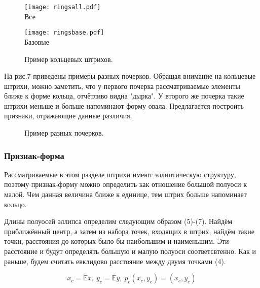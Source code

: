 \documentclass{article}
\begin{document}
\begin{figure}[h]
\begin{minipage}[h]{0.47\linewidth}
    \centering
    \texttt{[image: ringsall.pdf]} \\Все
\end{minipage}
\hfill
\begin{minipage}[h]{0.47\linewidth} 
    \centering
    \texttt{[image: ringsbase.pdf]} \\Базовые
\end{minipage}
\caption{Пример кольцевых штрихов.}
\end{figure}

На рис.7 приведены примеры разных почерков. Обращая внимание на кольцевые штрихи, можно заметить, что у первого почерка рассматриваемые элементы ближе к форме кольца, отчётливо видна "дырка". У второго же почерка такие штрихи меньше и больше напоминают форму овала. Предлагается построить признаки, отражающие данные различия. 

\begin{figure}[h]
\begin{minipage}[h]{1\linewidth}
\end{minipage}
\vfill
\begin{minipage}[h]{1\linewidth}
\end{minipage}
\caption{Пример разных почерков.}
\end{figure}

\subsubsection{Признак-форма}
Рассматриваемые в этом разделе штрихи имеют эллиптическую структуру, поэтому 
признак-форму можно определить как отношение большой полуоси к малой. Чем данная величина ближе к единице, тем штрих больше напоминает кольцо.

Длины полуосей эллипса определим следующим образом (5)-(7). Найдём приближённый центр, а затем из набора точек, входящих в штрих, найдём такие точки, расстояния до которых было бы наибольшим и наименьшим. Эти расстояние и будут определять большую и малую полуоси соответсвтенно. Как и раньше, будем считать евклидово расстояние между двумя точками (4).

\begin{equation}
    x_c = \mathbb{E}x,~y_c = \mathbb{E}y,~p_c(x_c, y_c) = (x_c, y_c)
\end{equation}
\end{document}

